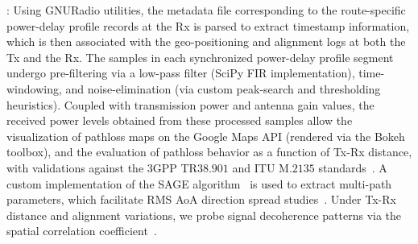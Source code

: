 \documentclass[10pt, twocolumn]{IEEEtran}
\begin{document}
: Using GNURadio utilities, the metadata file corresponding to the route-specific power-delay profile records at the Rx is parsed to extract timestamp information, which is then associated with the geo-positioning and alignment logs at both the Tx and the Rx. The samples in each synchronized power-delay profile segment undergo pre-filtering via a low-pass filter (SciPy FIR implementation), time-windowing, and noise-elimination (via custom peak-search and thresholding heuristics). Coupled with transmission power and antenna gain values, the received power levels obtained from these processed samples allow the visualization of pathloss maps on the Google Maps API (rendered via the Bokeh toolbox), and the evaluation of pathloss behavior as a function of Tx-Rx distance, with validations against the $3$GPP TR$38.901$ and ITU M$.2135$ standards~\cite{MacCartneyModelsOverview}. A custom implementation of the SAGE algorithm~\cite{SAGE} is used to extract multi-path parameters, which facilitate RMS AoA direction spread studies~\cite{Indoor60G}. Under Tx-Rx distance and alignment variations, we probe signal decoherence patterns via the spatial correlation coefficient~\cite{MacCartneySpatialStatistics}.
\end{document}
